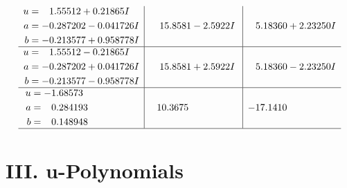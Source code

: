 \documentclass[1p]{elsarticle_modified}
\theoremstyle{definition}
\begin{document}
$$\begin{array}{c|c|c}
\begin{aligned}
u &= \phantom{-}1.55512 + 0.21865 I \\
a &= -0.287202 - 0.041726 I \\
b &= -0.213577 + 0.958778 I\end{aligned}
 & \phantom{-}15.8581 - 2.5922 I & \phantom{-}5.18360 + 2.23250 I \\ \hline\begin{aligned}
u &= \phantom{-}1.55512 - 0.21865 I \\
a &= -0.287202 + 0.041726 I \\
b &= -0.213577 - 0.958778 I\end{aligned}
 & \phantom{-}15.8581 + 2.5922 I & \phantom{-}5.18360 - 2.23250 I \\ \hline\begin{aligned}
u &= -1.68573\phantom{ +0.000000I} \\
a &= \phantom{-}0.284193\phantom{ +0.000000I} \\
b &= \phantom{-}0.148948\phantom{ +0.000000I}\end{aligned}
 & \phantom{-}10.3675\phantom{ +0.000000I} & -17.1410\phantom{ +0.000000I}\\
 \hline 
 \end{array}$$\newpage
\newpage\renewcommand{\arraystretch}{1}
\centering \section*{ III. u-Polynomials}
\end{document}
